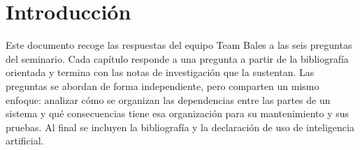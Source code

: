 
\chapter*{Introducción}

Este documento recoge las respuestas del equipo Team Bales a las seis preguntas del seminario. Cada capítulo responde a una pregunta a partir de la bibliografía orientada y termina con las notas de investigación que la sustentan. Las preguntas se abordan de forma independiente, pero comparten un mismo enfoque: analizar cómo se organizan las dependencias entre las partes de un sistema y qué consecuencias tiene esa organización para su mantenimiento y sus pruebas. Al final se incluyen la bibliografía y la declaración de uso de inteligencia artificial.
